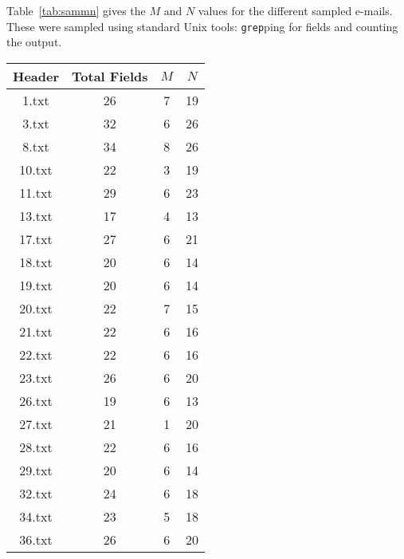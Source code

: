 Table~\ref{tab:sammn} gives the $M$ and $N$ values for the different sampled e-mails.  These were sampled using standard Unix tools: \texttt{grep}ping for fields and counting the output.

\begin{table}
\centering
\begin{tabular}{@{}cccc@{}}
\toprule
Header & Total Fields & $M$ & $N$ \\ \midrule
1.txt  & 26           & 7                     & 19                 \\
3.txt  & 32           & 6                     & 26                 \\
8.txt  & 34           & 8                     & 26                 \\
10.txt & 22           & 3                     & 19                 \\
11.txt & 29           & 6                     & 23                 \\
13.txt & 17           & 4                     & 13                 \\
17.txt & 27           & 6                     & 21                 \\
18.txt & 20           & 6                     & 14                 \\
19.txt & 20           & 6                     & 14                 \\
20.txt & 22           & 7                     & 15                 \\
21.txt & 22           & 6                     & 16                 \\
22.txt & 22           & 6                     & 16                 \\
23.txt & 26           & 6                     & 20                 \\
26.txt & 19           & 6                     & 13                 \\
27.txt & 21           & 1                     & 20                 \\
28.txt & 22           & 6                     & 16                 \\
29.txt & 20           & 6                     & 14                 \\
32.txt & 24           & 6                     & 18                 \\
34.txt & 23           & 5                     & 18                 \\
36.txt & 26           & 6                     & 20                 \\

\end{tabular}
\end{table}
